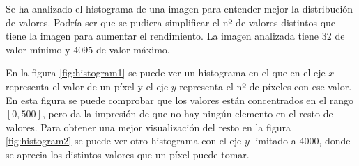 Se ha analizado el histograma de una imagen para entender mejor la distribución de valores. Podría ser que se pudiera simplificar el nº de valores distintos que tiene la imagen para aumentar el rendimiento. La imagen analizada tiene $ 32 $ de valor mínimo y $ 4095 $ de valor máximo.

En la figura \ref{fig:histogram1} se puede ver un histograma en el que en el eje $ x $ representa el valor de un píxel y el eje $ y $ representa el nº de píxeles con ese valor. En esta figura se puede comprobar que los valores están concentrados en el rango $ [0,500] $, pero da la impresión de que no hay ningún elemento en el resto de valores. Para obtener una mejor visualización del resto en la figura \ref{fig:histogram2} se puede ver otro histograma con el eje $ y $ limitado a 4000, donde se aprecia los distintos valores que un píxel puede tomar. 

